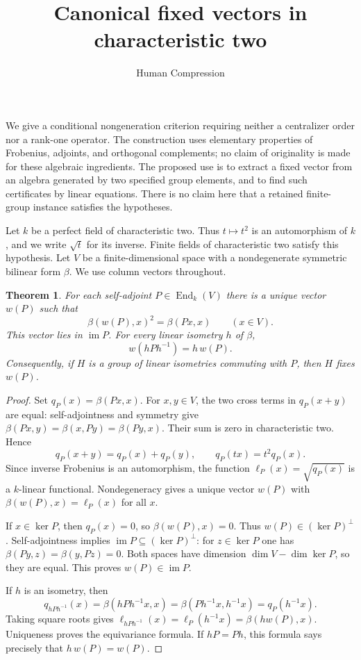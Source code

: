 \documentclass[11pt]{article}
\newtheorem{theorem}{Theorem}
\newcommand{\End}{\operatorname{End}}
\newcommand{\im}{\operatorname{im}}
\begin{document}
\title{Canonical fixed vectors in characteristic two}
\author{Human Compression}
\date{}
\maketitle

We give a conditional nongeneration criterion requiring neither a
centralizer order nor a rank-one operator.  The construction uses elementary
properties of Frobenius, adjoints, and orthogonal complements; no claim of
originality is made for these algebraic ingredients.  The proposed use is
to extract a fixed vector from an algebra generated by two specified group
elements, and to find such certificates by linear equations.  There is no
claim here that a retained finite-group instance satisfies the hypotheses.

Let $k$ be a perfect field of characteristic two.  Thus $t\mapsto t^2$ is
an automorphism of $k$, and we write $\sqrt{t}$ for its inverse.  Finite
fields of characteristic two satisfy this hypothesis.  Let $V$ be a
finite-dimensional space with a nondegenerate symmetric bilinear form
$\beta$.  We use column vectors throughout.

\begin{theorem}\label{thm:canonical}
For each self-adjoint $P\in\End_k(V)$ there is a unique vector $w(P)$
such that
\[
             \beta(w(P),x)^2=\beta(Px,x)\qquad(x\in V).
\]
This vector lies in $\im P$.  For every linear isometry $h$ of $\beta$,
\[
                  w(hPh^{-1})=h\,w(P).
\]
Consequently, if $H$ is a group of linear isometries commuting with $P$,
then $H$ fixes $w(P)$.
\end{theorem}

\begin{proof}
Set $q_P(x)=\beta(Px,x)$.  For $x,y\in V$, the two cross terms in
$q_P(x+y)$ are equal: self-adjointness and symmetry give
$\beta(Px,y)=\beta(x,Py)=\beta(Py,x)$.  Their sum is zero in
characteristic two.  Hence
\[
 q_P(x+y)=q_P(x)+q_P(y),\qquad q_P(t x)=t^2q_P(x).
\]
Since inverse Frobenius is an automorphism, the function
$\ell_P(x)=\sqrt{q_P(x)}$ is a $k$-linear functional.  Nondegeneracy
gives a unique vector $w(P)$ with $\beta(w(P),x)=\ell_P(x)$ for all $x$.

If $x\in\ker P$, then $q_P(x)=0$, so $\beta(w(P),x)=0$.
Thus $w(P)\in(\ker P)^\perp$.  Self-adjointness implies
$\im P\subseteq(\ker P)^\perp$: for $z\in\ker P$ one has
$\beta(Py,z)=\beta(y,Pz)=0$.  Both spaces have dimension
$\dim V-\dim\ker P$, so they are equal.  This proves $w(P)\in\im P$.

If $h$ is an isometry, then
\[
 q_{hPh^{-1}}(x)=\beta(hPh^{-1}x,x)
                =\beta(Ph^{-1}x,h^{-1}x)=q_P(h^{-1}x).
\]
Taking square roots gives
$\ell_{hPh^{-1}}(x)=\ell_P(h^{-1}x)=\beta(hw(P),x)$.
Uniqueness proves the equivariance formula.  If $hP=Ph$, this formula
says precisely that $h\,w(P)=w(P)$.
\end{proof}
\end{document}
